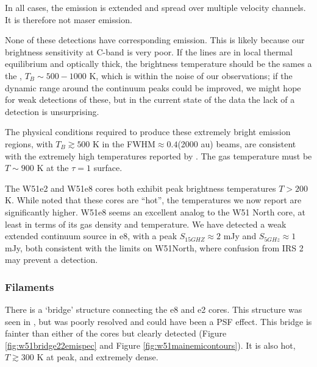 In all cases, the emission is extended and spread over multiple velocity
channels.  It is therefore not maser emission.

None of these detections have corresponding \oneone emission.  This is likely
because our brightness sensitivity at C-band is very poor.  If the
\formaldehyde lines are in local thermal equilibrium and optically thick, the
\oneone brightness temperature should be the sames a the \twotwo,
$T_B\sim500-1000$ K, which is within the noise of our observations; if the
dynamic range around the continuum peaks could be improved, we might hope for
weak detections of these, but in the current state of the data the lack of a
detection is unsurprising.

The physical conditions required to produce these extremely bright emission
regions, with $T_B \gtrsim 500$ K in the FWHM$\approx0.4$\arcsec (2000 au)
beams, are consistent with the extremely high temperatures reported by
\citet{Zapata2010a}.  The gas temperature must be $T\sim900$ K at the
\formaldehyde \twotwo $\tau=1$ surface.  


The W51e2 and W51e8 cores both exhibit peak brightness temperatures $T>200$ K.
While \citet{Zhang1997a} noted that these cores are ``hot'', the temperatures we
now report are significantly higher.  W51e8 seems an excellent analog to the W51 North
core, at least in terms of its gas density and temperature.  We have detected a
weak extended continuum source in e8, with a peak $S_{15 GHZ} \approx 2$ mJy
and $S_{5 GHz} \approx 1$ mJy, both consistent with the limits on W51North,
where confusion from IRS 2 may prevent a detection.

\subsubsection{Filaments}
There is a `bridge' structure connecting the e8 and e2 cores.  This structure
was seen in \citet{Zhang1997a}, but was poorly resolved and could have been a
PSF effect.  This bridge is fainter than either of the cores but clearly
detected (Figure \ref{fig:w51bridge22emispec} and Figure
\ref{fig:w51mainemicontours}).  It is also hot, $T\gtrsim300$ K at peak, and
extremely dense.

